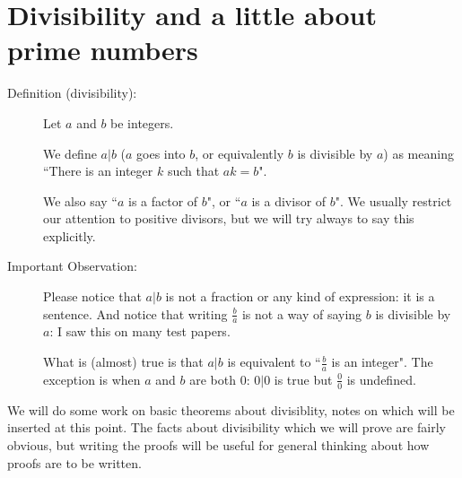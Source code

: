 \documentclass[12pt]{article}
\begin{document}
\section{Divisibility and a little about prime numbers}

\begin{description}

\item[Definition (divisibility):]  Let $a$ and $b$ be integers.

We define $a|b$ ($a$ goes into $b$, or equivalently $b$ is divisible by $a$) as meaning ``There  is an integer $k$ such that $ak=b$".

We also say ``$a$ is a factor of $b$", or ``$a$ is a divisor of $b$".  We usually restrict our attention to positive divisors, but we will try always to say this explicitly.

\item[Important Observation:]  Please notice that $a|b$ is not a fraction or any kind of expression:  it is a sentence.  And notice that writing $\frac ba$ is not a way of saying $b$ is divisible by $a$:  I saw this on many test papers.

What is (almost) true is that $a|b$ is equivalent to ``$\frac ba$ is an integer".   The exception is when $a$ and $b$ are both 0:  $0 | 0$ is true but $\frac 00$ is undefined.

\end{description}

We will do some work on basic theorems about divisiblity, notes on which will be inserted at this point.  The facts about divisibility which we will prove are fairly obvious, but writing the proofs will be useful for general thinking about how proofs are to be written.
\end{document}
